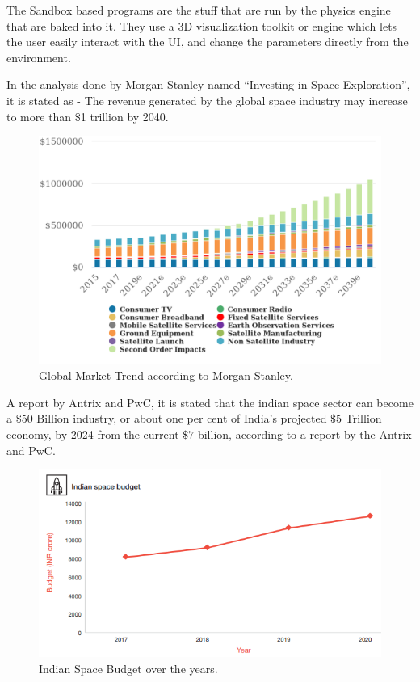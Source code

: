 \documentclass[12pt]{article}
\begin{document}
The Sandbox based programs are the stuff that are run by the physics engine that are baked into it. They use a 3D visualization toolkit or engine which lets the user easily interact with the UI, and change the parameters directly from the environment.

In the analysis done by Morgan Stanley named \enquote{Investing in Space Exploration}, it is stated as - The revenue generated by the global space industry may increase to more than $\$$1 trillion by 2040. \cite{morgan}
\begin{figure}[H]
\centering
\includegraphics[scale=0.28]{morganstanley.png}
\caption{Global Market Trend according to Morgan Stanley.} \label{morgangraph}
\end{figure}
A report by Antrix and PwC, it is stated that the indian space sector can become a $\$$50 Billion industry, or about one per cent of India's projected $\$5$ Trillion economy, by 2024 from the current $\$7$ billion, according to a report by the Antrix and PwC.\cite{indiaspace}
\begin{figure}[H]
\centering
\includegraphics[scale=1.2]{pwc.png}
\caption{Indian Space Budget over the years.} \label{pwc}
\end{figure}
\end{document}
